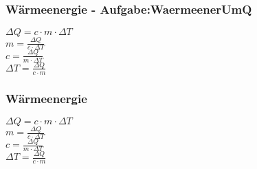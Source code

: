 \subsubsection{Wärmeenergie - Aufgabe:WaermeenerUmQ} 
\begin{minipage}{0.45\textwidth} 
$ \Delta Q = c\cdot m\cdot \Delta T $\\ 
$ m = \frac{ \Delta Q}{c\cdot \Delta T} $\\ 
$ c = \frac{ \Delta Q}{m\cdot \Delta T} $\\ 
$ \Delta T = \frac{\Delta Q}{c\cdot m} $\\ 
\end{minipage} 
\begin{minipage}{0.45\textwidth} 
 
\end{minipage} 
\subsubsection{Wärmeenergie} 
\begin{minipage}{0.45\textwidth} 
$ \Delta Q = c\cdot m\cdot \Delta T $\\ 
$ m = \frac{ \Delta Q}{c\cdot \Delta T} $\\ 
$ c = \frac{ \Delta Q}{m\cdot \Delta T} $\\ 
$ \Delta T = \frac{\Delta Q}{c\cdot m} $\\ 
\end{minipage} 
\begin{minipage}{0.45\textwidth} 
 
\end{minipage} 
